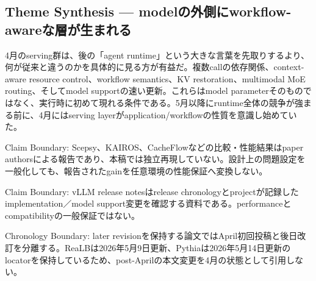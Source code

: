 \subsection{Theme Synthesis — modelの外側にworkflow-awareな層が生まれる}

4月のserving群は、後の「agent runtime」という大きな言葉を先取りするより、何が従来と違うのかを具体的に見る方が有益だ。複数callの依存関係、context-aware resource control、workflow semantics、KV restoration、multimodal MoE routing、そしてmodel supportの速い更新。これらはmodel parameterそのものではなく、実行時に初めて現れる条件である。5月以降にruntime全体の競争が強まる前に、4月にはserving layerがapplication/workflowの性質を意識し始めていた。\autocite{src-0fc9d11483aa,src-2a6eae37bd39,src-551442a9e215,src-b790ec92aa01,src-d91793d0a6fa,src-e1e959857ced,src-fe12f92c05d7}


\begin{claimboundary}
Claim Boundary: Scepsy、KAIROS、CacheFlowなどの比較・性能結果はpaper authorsによる報告であり、本稿では独立再現していない。設計上の問題設定を一般化しても、報告されたgainを任意環境の性能保証へ変換しない。\autocite{src-0fc9d11483aa,src-551442a9e215,src-e1e959857ced}
\end{claimboundary}

\begin{claimboundary}
Claim Boundary: vLLM release notesはrelease chronologyとprojectが記録したimplementation／model support変更を確認する資料である。performanceとcompatibilityの一般保証ではない。\autocite{src-b790ec92aa01,src-fe12f92c05d7}
\end{claimboundary}

\begin{claimboundary}
Chronology Boundary: later revisionを保持する論文ではApril初回投稿と後日改訂を分離する。ReaLBは2026年5月9日更新、Pythiaは2026年5月14日更新のlocatorを保持しているため、post-Aprilの本文変更を4月の状態として引用しない。\autocite{src-2a6eae37bd39,src-d91793d0a6fa}
\end{claimboundary}
